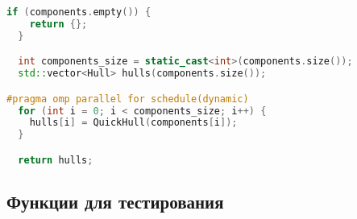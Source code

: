 \documentclass[12pt]{article}
\begin{document}
\label{appendix:mpi_3}
\begin{lstlisting}[language=C++, caption={MPI+OMP-версия, Построение оболочки для каждой из локальных компонент процесса в функции QuickHullAllMPIOMP()}]
  if (components.empty()) {
    return {};
  }

  int components_size = static_cast<int>(components.size());
  std::vector<Hull> hulls(components.size());

#pragma omp parallel for schedule(dynamic)
  for (int i = 0; i < components_size; i++) {
    hulls[i] = QuickHull(components[i]);
  }

  return hulls;
\end{lstlisting}

\newpage

\subsection{Функции для тестирования}
\label{appendix:image_run_test}
\end{document}
